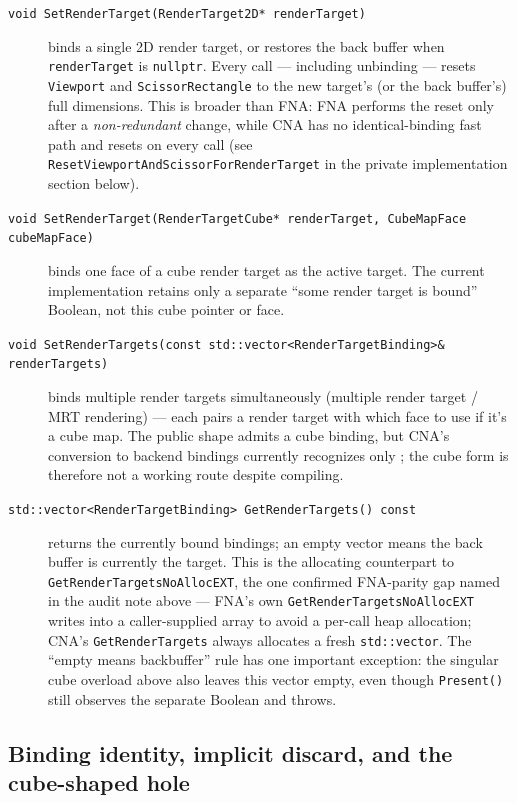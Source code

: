 \begin{description}
\item[\texttt{void SetRenderTarget(RenderTarget2D* renderTarget)}] binds a single 2D render
  target, or restores the back buffer when \texttt{renderTarget} is \texttt{nullptr}. Every call
  --- including unbinding --- resets \texttt{Viewport} and \texttt{ScissorRectangle} to the new
  target's (or the back buffer's) full dimensions. This is broader than FNA: FNA performs the
  reset only after a \emph{non-redundant} change, while CNA has no identical-binding fast path
  and resets on every call (see \texttt{ResetViewportAndScissorForRenderTarget} in the private
  implementation section below).
\item[\texttt{void SetRenderTarget(RenderTargetCube* renderTarget, CubeMapFace cubeMapFace)}]
  binds one face of a cube render target as the active target. The current implementation
  retains only a separate ``some render target is bound'' Boolean, not this cube pointer or
  face.
\item[\texttt{void SetRenderTargets(const std::vector<RenderTargetBinding>\& renderTargets)}]
  binds multiple render targets simultaneously (multiple render target / MRT rendering) ---
  each  pairs a render target with which face to use if it's a
  cube map. The public shape admits a cube binding, but CNA's conversion to backend bindings
  currently recognizes only ; the cube form is therefore not a
  working route despite compiling.
\item[\texttt{std::vector<RenderTargetBinding> GetRenderTargets() const}] returns the currently
  bound bindings; an empty vector means the back buffer is currently the target. This is the
  allocating counterpart to \texttt{GetRenderTargetsNoAllocEXT}, the one confirmed FNA-parity
  gap named in the audit note above --- FNA's own \texttt{GetRenderTargetsNoAllocEXT} writes
  into a caller-supplied array to avoid a per-call heap allocation; CNA's \texttt{GetRenderTargets}
  always allocates a fresh \texttt{std::vector}. The ``empty means backbuffer'' rule has one
  important exception: the singular cube overload above also leaves this vector empty, even
  though \texttt{Present()} still observes the separate Boolean and throws.
\end{description}

\subsection{Binding identity, implicit discard, and the cube-shaped hole}
\label{sec:graphicsdevice-target-binding-contract}

